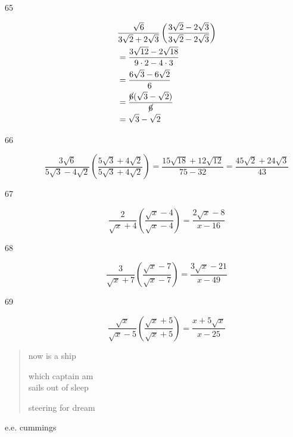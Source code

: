 \documentclass[fleqn,addpoints]{exam}
\begin{document}
\begin{description}
\item[65]
\begin{align*}
  & \frac{\sqrt{6}}{3\sqrt{2} + 2\sqrt{3}} \left( \frac{{3\sqrt{2} - 2\sqrt{3}}}{{3\sqrt{2} - 2\sqrt{3}}} \right) \\
  &= \frac{3\sqrt{12} - 2\sqrt{18}}{9 \cdot 2 - 4 \cdot 3} \\
  &= \frac{6\sqrt{3} - 6\sqrt{2}}{6} \\
  &= \frac{\cancel{6} (\sqrt{3} - \sqrt{2})}{\cancel{6}} \\
  &= \sqrt{3} - \sqrt{2} \\
\end{align*}

\item[66]
\[
  \frac{3\sqrt{6}}{5\sqrt{3} - 4\sqrt{2}} \left( \frac{5\sqrt{3} + 4\sqrt{2}  }{5\sqrt{3} + 4\sqrt{2}} \right) 
  = \frac{15\sqrt{18} + 12\sqrt{12}}{75 - 32} = \frac{45\sqrt{2} + 24\sqrt{3}}{43}
\]

\item[67]
\[
  \frac{2}{\sqrt{x} + 4} \left( \frac{\sqrt{x} - 4}{\sqrt{x} - 4} \right) = \frac{2\sqrt{x} - 8}{x-16}
\]

\item[68]
\[
  \frac{3}{\sqrt{x} + 7} \left( \frac{\sqrt{x} - 7}{\sqrt{x} - 7} \right) = \frac{3\sqrt{x} - 21}{x-49}
\]

\item[69]
\[
  \frac{\sqrt{x}}{\sqrt{x} - 5} \left( \frac{\sqrt{x} + 5}{\sqrt{x} + 5} \right) = \frac{x + 5\sqrt{x}}{x-25}
\]

\end{description}

\else
\vspace{3 cm}

{\em
\begin{verse}
now is a ship

which captain am \\
sails out of sleep 

steering for dream 
\end{verse}
}

\hspace{1 in} e.e. cummings

\fi
\end{document}
